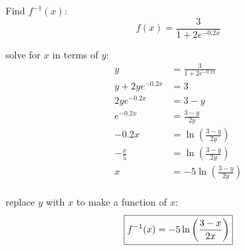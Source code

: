 \documentclass[fleqn,addpoints]{exam}
\begin{document}
\begin{questions}



    \bonusquestion[10]
      Find $f^{-1}(x)$:
      \[
        f(x) = \frac{3}{1 + 2e^{-0.2x}} 
      \]


      \begin{solution}

        solve for $x$ in terms of $y$:
        \begin{align*}
          y               & = \frac{3}{1 + 2e^{-0.2x}} \\
          y + 2ye^{-0.2x} & = 3 \\
          2ye^{-0.2x}     & = 3 - y \\
          e^{-0.2x}       & = \frac{3 - y}{2y} \\
          -0.2x           & = \ln \left( \frac{3 - y}{2y} \right) \\
          - \frac{x}{5}   & = \ln \left( \frac{3 - y}{2y} \right) \\
          x               & = -5 \ln \left( \frac{3 - y}{2y} \right) \\
        \end{align*}
        
        replace $y$ with $x$ to make a function of $x$:
        \[
          \boxed{ f^{-1}(x) = -5 \ln \left( \frac{3 - x}{2x} \right) } \\
        \]

      \end{solution}
  \end{questions}
\end{document}

